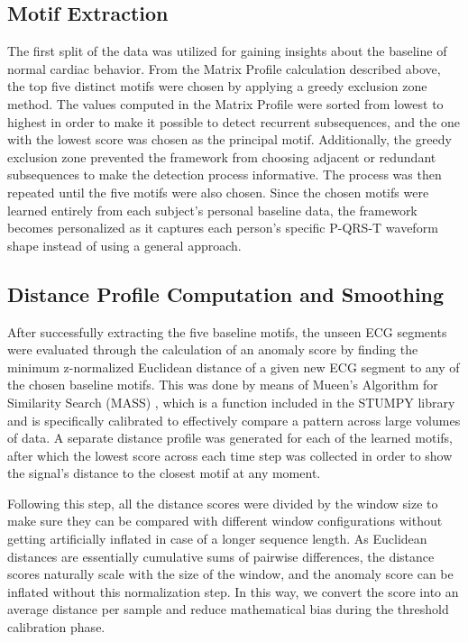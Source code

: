 \documentclass[conference,10pt]{IEEEtran}
\begin{document}
\subsection{Motif Extraction}

The first split of the data was utilized for gaining insights about the baseline of normal cardiac behavior. From the Matrix Profile calculation described above, the top five distinct motifs were chosen by applying a greedy exclusion zone method. The values computed in the Matrix Profile were sorted from lowest to highest in order to make it possible to detect recurrent subsequences, and the one with the lowest score was chosen as the principal motif. Additionally, the greedy exclusion zone prevented the framework from choosing adjacent or redundant subsequences to make the detection process informative. The process was then repeated until the five motifs were also chosen. 
Since the chosen motifs were learned entirely from each subject’s personal baseline data, the framework becomes personalized as it captures each person’s specific P-QRS-T waveform shape instead of using a general approach. 


\subsection{Distance Profile Computation and Smoothing}

After successfully extracting the five baseline motifs, the unseen ECG segments were evaluated through the calculation of an anomaly score by finding the minimum z-normalized Euclidean distance of a given new ECG segment to any of the chosen baseline motifs. This was done by means of Mueen’s Algorithm for Similarity Search (MASS) \cite{r18}, which is a function included in the STUMPY library and is specifically calibrated to effectively compare a pattern across large volumes of data. A separate distance profile was generated for each of the learned motifs, after which the lowest score across each time step was collected in order to show the signal’s distance to the closest motif at any moment. 

Following this step, all the distance scores were divided by the window size to make sure they can be compared with different window configurations without getting artificially inflated in case of a longer sequence length. As Euclidean distances are essentially cumulative sums of pairwise differences, the distance scores naturally scale with the size of the window, and the anomaly score can be inflated without this normalization step. In this way, we convert the score into an average distance per sample and reduce mathematical bias during the threshold calibration phase. 
\end{document}

